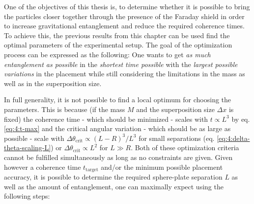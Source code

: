 One of the objectives of this thesis is, to determine whether it is possible to bring the particles closer together through the presence of the Faraday shield in order to increase gravitational entanglement and reduce the required coherence times.
To achieve this, the previous results from this chapter can be used find the optimal parameters of the experimental setup.
The goal of the optimization process can be expressed as the following:
One wants to get \textit{as much entanglement as possible} in the \textit{shortest time possible} with the \textit{largest possible variations} in the placement while still considering the limitations in the mass as well as in the superposition size.

In full generality, it is not possible to find a local optimum for choosing the parameters. This is because (if the mass $M$ and the superposition size $\Delta x$ is fixed) the coherence time - which should be minimized - scales with $t \propto L^3$ by eq. \eqref{eq:4:t-max} and the critical angular variation - which should be as large as possible - scale with $\Delta \theta_\mathrm{crit} \propto (L-R)^3/L^3$ for small separations (eq. \eqref{eq:4:delta-theta-scaling-L}) or $\Delta \theta_\mathrm{crit} \propto L^2$ for $L \gg R$. Both of these optimization criteria cannot be fulfilled simultaneously as long as no constraints are given.
Given however a coherence time $t_\mathrm{target}$ and/or the minimum possible placement accuracy, it is possible to determine the required sphere-plate separation $L$ as well as the amount of entanglement, one can maximally expect using the following steps:
